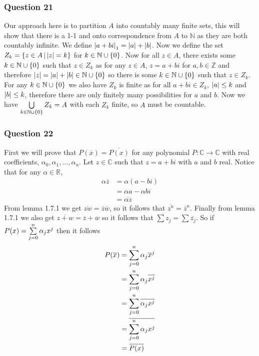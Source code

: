 \documentclass{article}
\begin{document}
\subsubsection{Question 21}

Our approach here is to partition $A$ into countably many finite sets, this will show that there is a 1-1 and onto correspondence from $A$ to $\mathbb N$ as they are both countably infinite. We define $\left|{a+bi}\right|_1 = \left|{a}\right| + \left|{b}\right|$. Now we define the set $Z_k = \left\{{z\in A} \,\middle|\, {\left|{z}\right| = k}\right\}$ for $k \in\mathbb N \cup\left\{ {0} \right\}$. Now for all $z\in A$, there exists some $k\in\mathbb N \cup\left\{ {0} \right\}$ such that $z\in Z_k$ as for any $z\in A$, $z = a+bi$ for $a,b\in\mathbb Z$ and therefore $\left|{z}\right| = \left|{a}\right| + \left|{b}\right| \in \mathbb N \cup \left\{ {0} \right\}$ so there is some $k\in\mathbb N \cup\left\{ {0} \right\}$ such that $z \in Z_k$. For any $k\in\mathbb N\cup\left\{ {0} \right\}$ we also have $Z_k$ is finite as for all $a+bi \in Z_k$, $\left|{a}\right|\le k$ and $\left|{b}\right| \le k$, therefore there are only finitely many possibilities for $a$ and $b$. Now we have $\bigcup\limits_{k\in\mathbb N \cup\left\{ {0} \right\}}^{}  {Z_k}  = A$ with each $Z_k$ finite, so $A$ must be countable.


\subsubsection{Question 22}	

First we will prove that $P(\overline x) = \overline{P(x)}$ for any polynomial $P:\mathbb C \to \mathbb C$ with real coefficients, $\alpha_0, \alpha_1,\ldots,\alpha_n$. Let $z \in \mathbb C$ such that $z = a+bi$ with $a$ and $b$ real. Notice that for any $\alpha\in\mathbb R$, 
\begin{align*}
\alpha\overline z &= \alpha(a - bi) \\
&= \alpha a - \alpha bi \\
&= \overline{\alpha z}
\end{align*}
From lemma 1.7.1 we get $\overline{zw} = \overline z \overline w$, so it follows that $\overline{z^n} = \overline{z}^n$. Finally from lemma 1.7.1 we also get $\overline {z + w} = \overline z + \overline w$ so it follows that $\overline{\sum z_j} = \sum \overline{z_j}$. So if $P(x) = \sum\limits_{j=0}^{n}  {\alpha_jx^j} $ then it follows
\begin{align*}
P(\overline{x}) &= \sum\limits_{j=0}^{n}  {\alpha_j\overline x^j}  \\
&= \sum\limits_{j=0}^{n}  {\alpha_j\overline{x^j}}  \\
&= \sum\limits_{j=0}^{n}  {\overline{\alpha_jx^j}}  \\
&= \overline{\sum\limits_{j=0}^{n}  {\alpha_jx^j} } \\
&= \overline{P(x)}
\end{align*}
\end{document}
